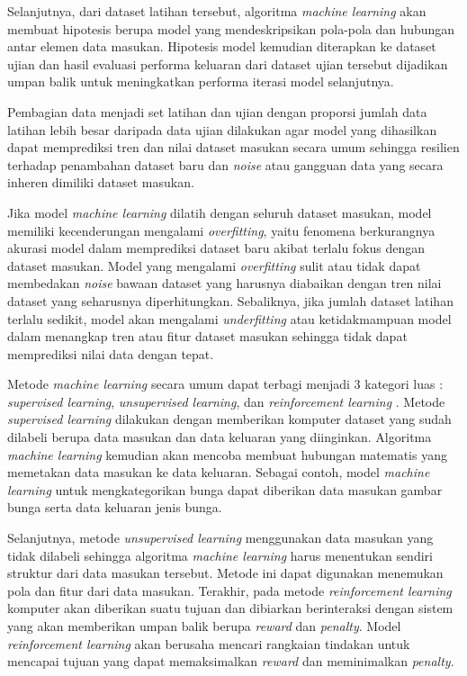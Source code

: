 Selanjutnya, dari dataset latihan tersebut, algoritma \textit{machine learning}
akan membuat hipotesis berupa model yang mendeskripsikan pola-pola dan hubungan
antar elemen data masukan. Hipotesis model kemudian diterapkan ke dataset ujian
dan hasil evaluasi performa keluaran dari dataset ujian tersebut dijadikan
umpan balik untuk meningkatkan performa iterasi model selanjutnya.

Pembagian data menjadi set latihan dan ujian dengan proporsi jumlah data
latihan lebih besar daripada data ujian dilakukan agar model yang dihasilkan
dapat memprediksi tren dan nilai dataset masukan secara umum sehingga resilien
terhadap penambahan dataset baru dan \textit{noise} atau gangguan data yang
secara inheren dimiliki dataset masukan.

Jika model \textit{machine learning} dilatih dengan seluruh dataset masukan, model
memiliki kecenderungan mengalami \textit{overfitting}, yaitu fenomena
berkurangnya akurasi model dalam memprediksi dataset baru akibat terlalu
fokus dengan dataset masukan. Model yang mengalami \textit{overfitting} sulit
atau tidak dapat membedakan \textit{noise} bawaan dataset yang harusnya
diabaikan dengan tren nilai dataset yang seharusnya diperhitungkan. Sebaliknya,
jika jumlah dataset latihan terlalu sedikit, model akan mengalami
\textit{underfitting} atau ketidakmampuan model dalam menangkap tren atau fitur
dataset masukan sehingga tidak dapat memprediksi nilai data dengan tepat.

Metode \textit{machine learning} secara umum dapat terbagi menjadi 3 kategori
luas : \textit{supervised learning}, \textit{unsupervised learning}, dan
\textit{reinforcement learning} \cite{russell1995}. Metode \textit{supervised learning} dilakukan
dengan memberikan komputer dataset yang sudah dilabeli berupa data masukan dan
data keluaran yang diinginkan. Algoritma \textit{machine learning} kemudian
akan mencoba membuat hubungan matematis yang memetakan data masukan ke data
keluaran. Sebagai contoh, model \textit{machine learning} untuk mengkategorikan
bunga dapat diberikan data masukan gambar bunga serta data keluaran jenis bunga.

Selanjutnya, metode \textit{unsupervised learning} menggunakan data masukan
yang tidak dilabeli sehingga algoritma \textit{machine learning} harus
menentukan sendiri struktur dari data masukan tersebut. Metode ini dapat
digunakan menemukan pola dan fitur dari data masukan. Terakhir, pada metode
\textit{reinforcement learning} komputer akan diberikan suatu tujuan dan
dibiarkan berinteraksi dengan sistem yang akan memberikan umpan balik berupa
\textit{reward} dan \textit{penalty}. Model \textit{reinforcement learning}
akan berusaha mencari rangkaian tindakan untuk mencapai tujuan yang dapat
memaksimalkan \textit{reward} dan meminimalkan \textit{penalty}.


